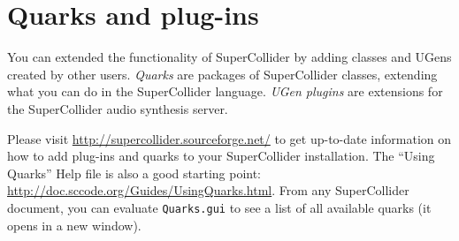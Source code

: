 \section{Quarks and plug-ins}

You can extended the functionality of SuperCollider by adding classes and UGens created by other users. \emph{Quarks} are packages of SuperCollider classes, extending what you can do in the SuperCollider language. \emph{UGen plugins} are extensions for the SuperCollider audio synthesis server.

Please visit \url{http://supercollider.sourceforge.net/} to get up-to-date information on how to add plug-ins and quarks to your SuperCollider installation. The ``Using Quarks'' Help file is also a good starting point: \url{http://doc.sccode.org/Guides/UsingQuarks.html}. From any SuperCollider document, you can evaluate \texttt{Quarks.gui} to see a list of all available quarks (it opens in a new window).